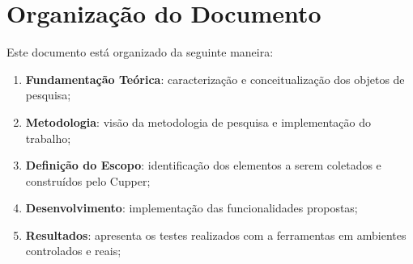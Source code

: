 \section*{Organização do Documento}
\label{sec:org}

Este documento está organizado da seguinte maneira:

\begin{enumerate}
  \item \textbf{Fundamentação Teórica}: caracterização e conceitualização dos
    objetos de pesquisa;
  \item \textbf{Metodologia}: visão da metodologia de pesquisa e implementação
    do trabalho;
  \item \textbf{Definição do Escopo}: identificação dos elementos a serem coletados
    e construídos pelo Cupper;
  \item \textbf{Desenvolvimento}: implementação das funcionalidades propostas;
  \item \textbf{Resultados}: apresenta os testes realizados com a ferramentas em
    ambientes controlados e reais;
\end{enumerate}

